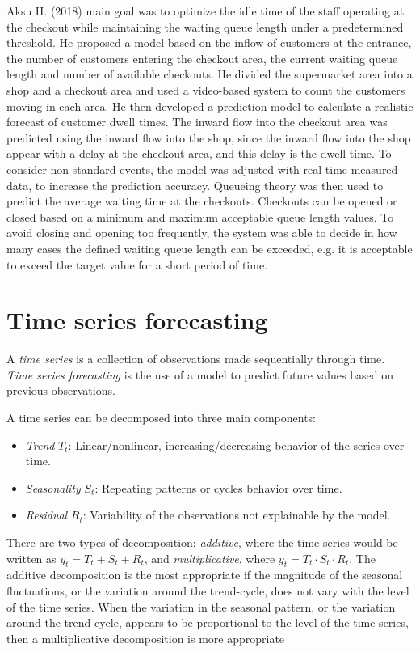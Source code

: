 Aksu H. (2018) \cite{aksu} main goal was to optimize the idle time of the staff operating at the checkout while maintaining the waiting queue length under a predetermined threshold. He proposed a model based on the inflow of customers at the entrance, the number of customers entering the checkout area, the current waiting queue length and number of available checkouts. He divided the supermarket area into a shop and a checkout area and used a video-based system to count the customers moving in each area. He then developed a prediction model to calculate a realistic forecast of customer dwell times. The inward flow into the checkout area was predicted using the inward flow into the shop, since the inward flow into the shop appear with a delay at the checkout area, and this delay is the dwell time. To consider non-standard events, the model was adjusted with real-time measured data, to increase the prediction accuracy. Queueing theory was then used to predict the average waiting time at the checkouts. Checkouts can be opened or closed based on a minimum and maximum acceptable queue length values. To avoid closing and opening too frequently, the system was able to decide in how many cases the defined waiting queue length can be exceeded, e.g. it is acceptable to exceed the target value for a short period of time.

\section{Time series forecasting}
\label{sec:time_series_forecasting}

A \emph{time series} is a collection of observations made sequentially through time. \emph{Time series forecasting} is the use of a model to predict future values based on previous observations.

A time series can be decomposed into three main components:
\begin{itemize}
  \item \emph{Trend} \( T_t \): Linear/nonlinear, increasing/decreasing behavior of the series over time.
  \item \emph{Seasonality} \( S_t \): Repeating patterns or cycles behavior over time.
  \item \emph{Residual} \( R_t \): Variability of the observations not explainable by the model.
\end{itemize}

There are two types of decomposition: \emph{additive}, where the time series would be written as \( y_t = T_t + S_t + R_t \), and \emph{multiplicative}, where \( y_t = T_t \cdot S_t \cdot R_t \).
The additive decomposition is the most appropriate if the magnitude of the seasonal fluctuations, or the variation around the trend-cycle, does not vary with the level of the time series. When the variation in the seasonal pattern, or the variation around the trend-cycle, appears to be proportional to the level of the time series, then a multiplicative decomposition is more appropriate

